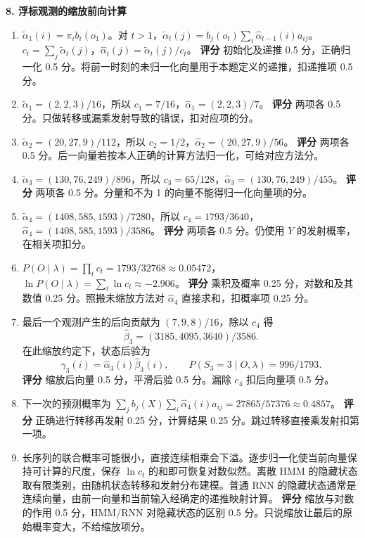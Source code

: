 \noindent\textbf{8. 浮标观测的缩放前向计算}
\begin{enumerate}[label=(\arabic*)]
\item $\widetilde\alpha_1(i)=\pi_i b_i(o_1)$。对 $t>1$，$\widetilde\alpha_t(j)=b_j(o_t)\sum_i\widehat\alpha_{t-1}(i)a_{ij}$。$c_t=\sum_j\widetilde\alpha_t(j)$，$\widehat\alpha_t(j)=\widetilde\alpha_t(j)/c_t$。
\textbf{评分} 初始化及递推 0.5 分，正确归一化 0.5 分。将前一时刻的未归一化向量用于本题定义的递推，扣递推项 0.5 分。
\item $\widetilde\alpha_1=(2,2,3)/16$，所以 $c_1=7/16$，$\widehat\alpha_1=(2,2,3)/7$。
\textbf{评分} 两项各 0.5 分。只做转移或漏乘发射导致的错误，扣对应项的分。
\item $\widetilde\alpha_2=(20,27,9)/112$，所以 $c_2=1/2$，$\widehat\alpha_2=(20,27,9)/56$。
\textbf{评分} 两项各 0.5 分。后一向量若按本人正确的计算方法归一化，可给对应方法分。
\item $\widetilde\alpha_3=(130,76,249)/896$，所以 $c_3=65/128$，$\widehat\alpha_3=(130,76,249)/455$。
\textbf{评分} 两项各 0.5 分。分量和不为 1 的向量不能得归一化向量项的分。
\item $\widetilde\alpha_4=(1408,585,1593)/7280$，所以 $c_4=1793/3640$，$\widehat\alpha_4=(1408,585,1593)/3586$。
\textbf{评分} 两项各 0.5 分。仍使用 $Y$ 的发射概率，在相关项扣分。
\item $P(O\mid\lambda)=\prod_t c_t=1793/32768\approx0.05472$，$\ln P(O\mid\lambda)=\sum_t\ln c_t\approx-2.906$。
\textbf{评分} 乘积及概率 0.25 分，对数和及其数值 0.25 分。照搬未缩放方法对 $\widehat\alpha_4$ 直接求和，扣概率项 0.25 分。
\item 最后一个观测产生的后向贡献为 $(7,9,8)/16$，除以 $c_4$ 得
\[
 \widehat\beta_3=(3185,4095,3640)/3586.
\]
在此缩放约定下，状态后验为
\[
 \gamma_3(i)=\widehat\alpha_3(i)\widehat\beta_3(i),\qquad
 P(S_3=3\mid O,\lambda)=996/1793.
\]
\textbf{评分} 缩放后向量 0.5 分，平滑后验 0.5 分。漏除 $c_4$ 扣后向量项 0.5 分。
\item 下一次的预测概率为 $\sum_j b_j(X)\sum_i\widehat\alpha_4(i)a_{ij}=27865/57376\approx0.4857$。
\textbf{评分} 正确进行转移再发射 0.25 分，计算结果 0.25 分。跳过转移直接乘发射扣第一项。
\item 长序列的联合概率可能很小，直接连续相乘会下溢。逐步归一化使当前向量保持可计算的尺度，保存 $\ln c_t$ 的和即可恢复对数似然。离散 HMM 的隐藏状态取有限类别，由随机状态转移和发射分布建模。普通 RNN 的隐藏状态通常是连续向量，由前一向量和当前输入经确定的递推映射计算。
\textbf{评分} 缩放与对数的作用 0.5 分，HMM/RNN 对隐藏状态的区别 0.5 分。只说缩放让最后的原始概率变大，不给缩放项分。
\end{enumerate}
